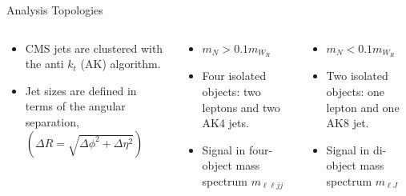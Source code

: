 \documentclass[aspectratio=169]{beamer}
\begin{document}
\begin{frame}[t]{Analysis Topologies}
  \begin{columns}[t]
    \begin{column}{0.32\textwidth}
      \centering
      \resizebox{0.99\linewidth}{!}{%
      }
      {
        \footnotesize
        \begin{itemize}
          \item CMS jets are clustered with the anti $k_t$ (AK) algorithm.
          \item Jet sizes are defined in terms of the angular separation, $\left(\Delta R = \sqrt{\Delta \phi^{2} + \Delta \eta^{2}}\right)$
        \end{itemize}
      }
    \end{column}
    \begin{column}{0.32\textwidth}
      \centering
      \resizebox{0.99\linewidth}{!}{%
      }
      {
        \footnotesize
        \begin{itemize}
          \item $m_{N} > 0.1 m_{W_{R}}$
          \item Four isolated objects: two leptons and two AK4 jets.
          \item Signal in four-object mass spectrum $m_{\ell \ell j j}$
        \end{itemize}
      }
    \end{column}
    \begin{column}{0.32\textwidth}
      \centering
      \resizebox{0.99\linewidth}{!}{%
      }
      {
        \footnotesize
        \begin{itemize}
          \item $m_{N} < 0.1 m_{W_{R}}$
          \item Two isolated objects: one lepton and one AK8 jet.
          \item Signal in di-object mass spectrum $m_{\ell J}$
        \end{itemize}
      }
    \end{column}
  \end{columns}
\end{frame}
\end{document}
